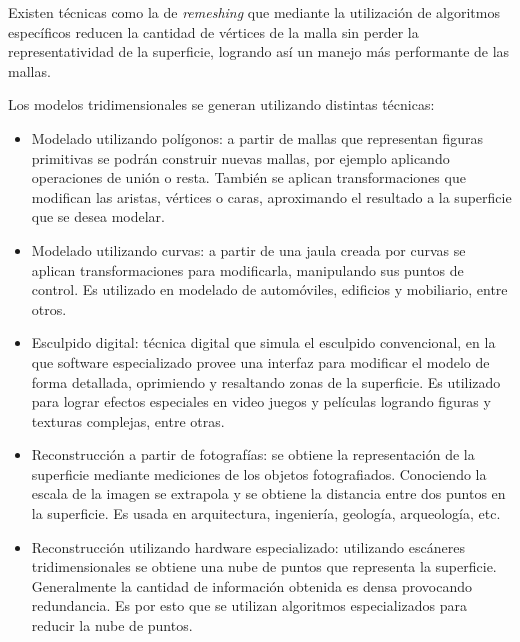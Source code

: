 Existen técnicas como la de \emph{remeshing} que mediante la utilización de algoritmos específicos reducen la cantidad de vértices de la malla sin perder la representatividad de la superficie, logrando así un manejo más performante de las mallas. %

Los modelos tridimensionales se generan utilizando distintas técnicas:
\begin{itemize}
  \item Modelado utilizando polígonos: a partir de mallas que representan figuras primitivas se podrán construir nuevas mallas, por ejemplo aplicando operaciones de unión o resta.
  También se aplican transformaciones que modifican las aristas, vértices o caras, aproximando el resultado a la superficie que se desea modelar.
  \item  Modelado utilizando curvas: a partir de una jaula creada por curvas se aplican transformaciones para modificarla, manipulando sus puntos de control. Es utilizado en modelado de automóviles, edificios y mobiliario, entre otros.
  \item Esculpido digital: técnica digital que simula el esculpido convencional, en la que software especializado provee una interfaz para modificar el modelo de forma detallada, oprimiendo y resaltando zonas de la superficie. Es utilizado para lograr efectos especiales en video juegos y películas logrando figuras y texturas complejas, entre otras.
  \item Reconstrucción a partir de fotografías: se obtiene la representación de la superficie mediante mediciones de los objetos fotografiados. Conociendo la escala de la imagen se extrapola y se obtiene la distancia entre dos puntos en la superficie. Es usada en arquitectura, ingeniería, geología, arqueología, etc.
  \item Reconstrucción utilizando hardware especializado: utilizando escáneres tridimensionales se obtiene una nube de puntos que representa la superficie. Generalmente la cantidad de información obtenida es densa provocando redundancia. Es por esto que se utilizan algoritmos especializados para reducir la nube de puntos.

\end{itemize}
